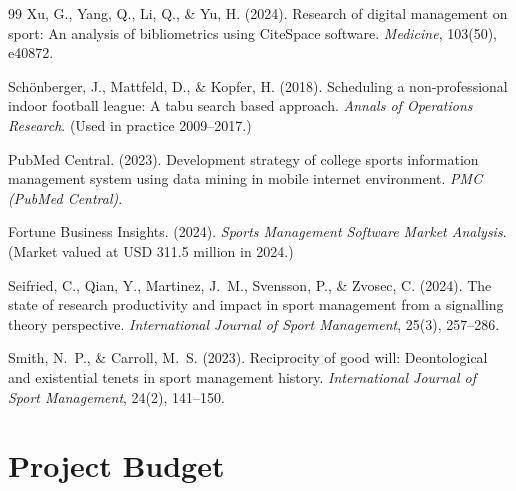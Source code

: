 \documentclass[12pt,a4paper]{report}
\begin{document}
\begin{thebibliography}{99}
Xu, G., Yang, Q., Li, Q., \& Yu, H. (2024). Research of digital management on sport: An analysis of bibliometrics using CiteSpace software. \textit{Medicine}, 103(50), e40872.

Schönberger, J., Mattfeld, D., \& Kopfer, H. (2018). Scheduling a non-professional indoor football league: A tabu search based approach. \textit{Annals of Operations Research}. (Used in practice 2009--2017.)

PubMed Central. (2023). Development strategy of college sports information management system using data mining in mobile internet environment. \textit{PMC (PubMed Central)}.

Fortune Business Insights. (2024). \textit{Sports Management Software Market Analysis}. (Market valued at USD 311.5 million in 2024.)

Seifried, C., Qian, Y., Martinez, J.~M., Svensson, P., \& Zvosec, C. (2024). The state of research productivity and impact in sport management from a signalling theory perspective. \textit{International Journal of Sport Management}, 25(3), 257--286.

Smith, N.~P., \& Carroll, M.~S. (2023). Reciprocity of good will: Deontological and existential tenets in sport management history. \textit{International Journal of Sport Management}, 24(2), 141--150.

\end{thebibliography}

\appendix

\chapter{Project Budget}
\end{document}
